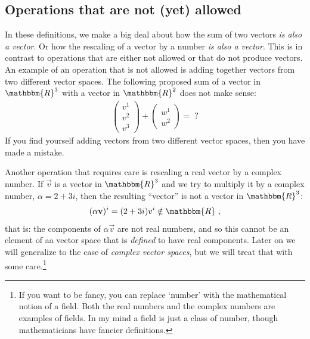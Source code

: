 \documentclass[12pt]{article}
\begin{document}
\subsection{Operations that are not (yet) allowed}

In these definitions, we make a big deal about how the sum of two vectors \emph{is also a vector}. Or how the rescaling of a vector by a number \emph{is also a vector}. This is in contrast to operations that are either not allowed or that do not produce vectors. An example of an operation that is not allowed is adding together vectors from two different vector spaces. The following proposed sum of a vector in $\mathbbm{R}^3$ with  a vector in $\mathbbm{R}^2$ does not make sense:
\begin{align}
    \begin{pmatrix}
        v^1\\ v^2 \\v^3
    \end{pmatrix}
    +
    \begin{pmatrix}
        w^1\\ w^2 
    \end{pmatrix}
    =
    \; ?
\end{align}
If you find yourself adding vectors from two different vector spaces, then you have made a mistake.

Another operation that requires care is rescaling a real vector by a complex number. If $\vec{v}$ is a vector in $\mathbbm{R}^3$ and we try to multiply it by a complex number, $\alpha = 2+3i$, then the resulting ``vector'' is not a vector in $\mathbbm{R}^3$:
\begin{align}
    (\alpha\vec{v})^i = (2+3i)v^i \notin \mathbbm{R} \ ,
\end{align}
that is: the components of $\alpha\vec{v}$ are not real numbers, and so this cannot be an element of aa vector space that is \emph{defined} to have real components. Later on we will generalize to the case of \emph{complex vector spaces}, but we will treat that with some care.\footnote{If you want to be fancy, you can replace `number' with the mathematical notion of a field. Both the real numbers and the complex numbers are examples of fields. In my mind a field is just a class of number, though mathematicians have fancier definitions.}
\end{document}
